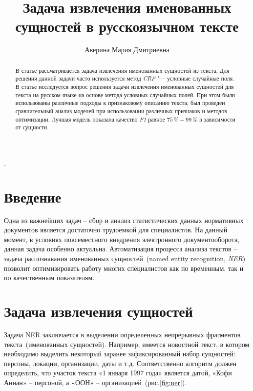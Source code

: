 \documentclass{csmathnotes}
\title{Задача извлечения именованных сущностей в русскоязычном тексте}
\author{Аверина Мария Дмитриевна}
\affiliation{Ярославский государственный университет им. П.\,Г. Демидова}
\begin{document}
\maketitle

\begin{abstract}
В статье рассматривается задача извлечения именованных сущностей из текста.
Для решения данной задачи часто используется метод \emph{CRF} "--- условные случайные поля.
В статье исследуется вопрос решения задачи извлечения именованных сущностей для текста на русском языке на основе метода условных случайных полей.
При этом были использованы различные подходы к признаковому описанию текста,
был проведен сравнительный анализ моделей при использовании различных признаков и методов оптимизации.
Лучшая модель показала качество \emph{F1} равное $75\,\% - 99\,\%$ в зависимости от сущности.
\end{abstract}

.

\section*{Введение}
Одна из важнейших задач – сбор и анализ статистических данных нормативных
документов является достаточно трудоемкой для специалистов. На данный момент, в условиях повсеместного внедрения электронного документооборота, данная задача особенно актуальна. Автоматизация процесса анализа текстов – задача распознавания именованных сущностей~(named entity recognition, \emph{NER})~\cite{base} позволит оптимизировать работу многих специалистов как по временным, так и по качественным показателям.


\section*{Задача извлечения сущностей}

Задача NER заключается в выделении определенных непрерывных фрагментов текста~(именованных сущностей).
Например, имеется новостной текст, в котором необходимо выделить некоторый заранее зафиксированный набор сущностей: персоны, локации, организации, даты и т.д.
Соответственно алгоритм должен определить, что участок текста «1 января 1997 года» является датой, «Кофи Аннан» – персоной, а «ООН» – организацией~(рис.\ref{fig:ner}).
\end{document}
